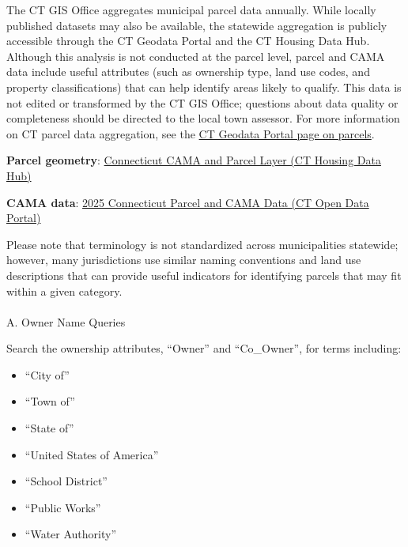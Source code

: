 \documentclass[
  letterpaper,
  DIV=11,
  numbers=noendperiod]{scrreprt}
\makeatletter
\let\oldparagraph\paragraph
\renewcommand{\paragraph}{
    \@ifstar
      \xxxParagraphStar
      \xxxParagraphNoStar
  }
\newcommand{\xxxParagraphStar}[1]{\oldparagraph*{#1}\mbox{}}
\newcommand{\xxxParagraphNoStar}[1]{\oldparagraph{#1}\mbox{}}
\providecommand{\tightlist}{%
  \setlength{\itemsep}{0pt}\setlength{\parskip}{0pt}}
\makeatother
\begin{document}
The CT GIS Office aggregates municipal parcel data annually. While
locally published datasets may also be available, the statewide
aggregation is publicly accessible through the CT Geodata Portal and the
CT Housing Data Hub. Although this analysis is not conducted at the
parcel level, parcel and CAMA data include useful attributes (such as
ownership type, land use codes, and property classifications) that can
help identify areas likely to qualify. This data is not edited or
transformed by the CT GIS Office; questions about data quality or
completeness should be directed to the local town assessor. For more
information on CT parcel data aggregation, see the
\href{https://geodata.ct.gov/pages/parcels}{CT Geodata Portal page on
parcels}.

\textbf{Parcel geometry}:
\href{https://housingmaps.ct.gov/datasets/ctmaps::connecticut-cama-and-parcel-layer/about}{Connecticut
CAMA and Parcel Layer (CT Housing Data Hub)}

\textbf{CAMA data}:
\href{https://data.ct.gov/Local-Government/2025-Connecticut-Parcel-and-CAMA-Data/rny9-6ak2/about_data}{2025
Connecticut Parcel and CAMA Data (CT Open Data Portal)}

\begin{tcolorbox}[enhanced jigsaw, arc=.35mm, bottomrule=.15mm, breakable, colback=white, colframe=quarto-callout-warning-color-frame, left=2mm, leftrule=.75mm, opacityback=0, rightrule=.15mm, toprule=.15mm]

Please note that terminology is not standardized across municipalities
statewide; however, many jurisdictions use similar naming conventions
and land use descriptions that can provide useful indicators for
identifying parcels that may fit within a given category.

\end{tcolorbox}

\paragraph{A. Owner Name Queries}\label{a.-owner-name-queries}

Search the ownership attributes, ``Owner'' and ``Co\_Owner'', for terms
including:

\begin{itemize}
\tightlist
\item
  ``City of''
\item
  ``Town of''
\item
  ``State of''
\item
  ``United States of America''
\item
  ``School District''
\item
  ``Public Works''
\item
  ``Water Authority''
\end{itemize}
\end{document}

